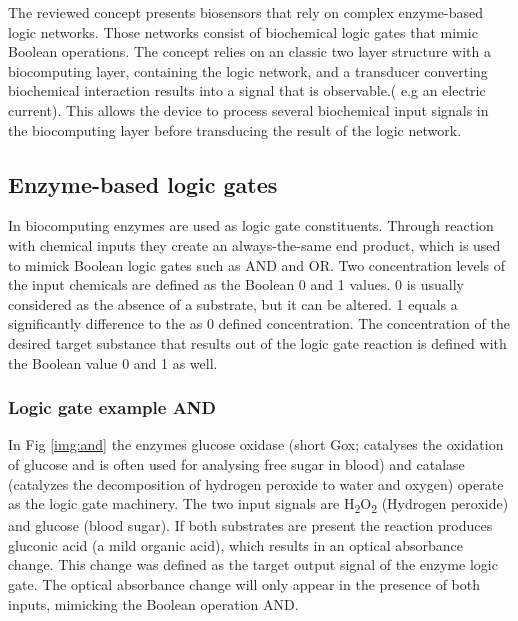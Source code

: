 \documentclass[runningheads]{llncs}
\begin{document}
The reviewed concept presents biosensors that rely on complex enzyme-based logic networks. Those networks consist of biochemical logic gates that mimic Boolean operations. The concept relies on an classic two layer structure with a biocomputing layer, containing the logic network, and a transducer converting biochemical interaction results into a signal that is observable.( e.g an electric current). This allows the device to process several biochemical input signals in the biocomputing layer before transducing the result of the logic network. \cite{application review}\cite{original}\cite{state of the art}


\subsection{Enzyme-based logic gates}		
		In biocomputing enzymes are used as logic gate constituents. Through reaction with chemical inputs they create an always-the-same end product, which is used to mimick Boolean logic gates such as AND and OR. Two concentration levels of the input chemicals are defined as the Boolean 0 and 1 values. 0 is usually considered as the absence of a substrate, but it can be altered. 1 equals a significantly difference to the as 0 defined concentration. 
		The concentration of the desired target substance that results out of the logic gate reaction is defined with the Boolean value 0 and 1 as well. \cite{original} \cite{haupt}\\
	
		\subsubsection{Logic gate example AND}
		In Fig \ref{img:and} the enzymes glucose oxidase (short Gox; catalyses the oxidation of glucose and is often used for analysing free sugar in blood) and catalase (catalyzes the decomposition of hydrogen peroxide to water and oxygen) operate as the logic gate machinery. The two input signals are H\textsubscript{2}O\textsubscript{2} (Hydrogen peroxide) and glucose (blood sugar). If both substrates are present the reaction produces gluconic acid (a mild organic acid), which results in an optical absorbance change. This change was defined as the target output signal of the enzyme logic gate. The optical absorbance change will only appear in the presence of both inputs, mimicking the Boolean operation AND. \cite{original}\cite{haupt}\cite{chemie}
		
\end{document}
